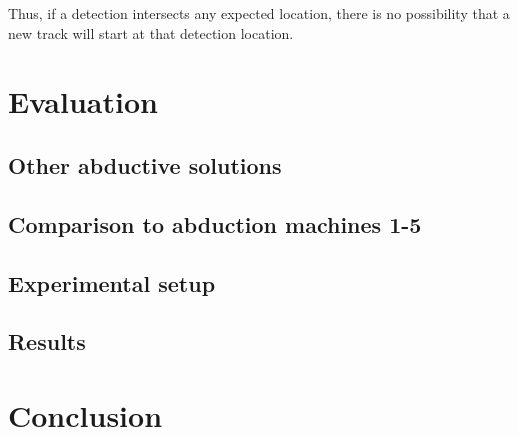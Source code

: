 \documentclass{book}
\begin{document}
Thus, if a detection intersects any expected location, there is no
possibility that a new track will start at that detection location.

\chapter{Evaluation}

\section{Other abductive solutions}

\section{Comparison to abduction machines 1-5}

\section{Experimental setup}

\section{Results}

\chapter{Conclusion}
\end{document}
